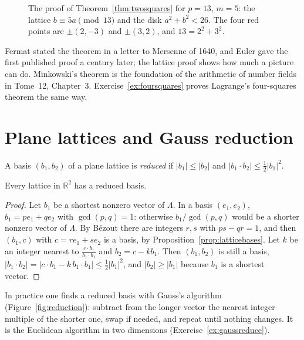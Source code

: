 \begin{figure}[ht]
\centering
{}
\caption{The proof of Theorem~\ref{thm:twosquares} for $p=13$, $m=5$: the lattice $b\equiv5a\pmod{13}$ and the disk $a^2+b^2<26$. The four red points are
$\pm(2,-3)$ and $\pm(3,2)$, and $13=2^2+3^2$.}
\label{fig:twosquares}
\end{figure}

Fermat stated the theorem in a letter to Mersenne of 1640, and Euler gave the first published proof a century later; the lattice proof shows how much a
picture can do. Minkowski's theorem is the foundation of the arithmetic of number fields in Tome~12, Chapter~3. Exercise~\ref{ex:foursquares} proves
Lagrange's four-squares theorem the same way.

\section{Plane lattices and Gauss reduction}

\begin{definition}
A basis $(b_1,b_2)$ of a plane lattice is \emph{reduced} if $|b_1|\le|b_2|$ and $|b_1\cdot b_2|\le\frac12|b_1|^2$.
\end{definition}

\begin{proposition}\label{prop:reducedexists}
Every lattice in $\mathbb R^2$ has a reduced basis.
\end{proposition}

\begin{proof}
Let $b_1$ be a shortest nonzero vector of $\Lambda$. In a basis $(e_1,e_2)$, $b_1=pe_1+qe_2$ with $\gcd(p,q)=1$: otherwise $b_1/\gcd(p,q)$ would be a
shorter nonzero vector of $\Lambda$. By B\'ezout there are integers $r,s$ with $ps-qr=1$, and then $(b_1,c)$ with $c=re_1+se_2$ is a basis, by
Proposition~\ref{prop:latticebases}. Let $k$ be an integer nearest to $\frac{c\cdot b_1}{b_1\cdot b_1}$ and $b_2=c-kb_1$. Then $(b_1,b_2)$ is still a basis,
$|b_1\cdot b_2|=|c\cdot b_1-k\,b_1\cdot b_1|\le\frac12|b_1|^2$, and $|b_2|\ge|b_1|$ because $b_1$ is a shortest vector.
\end{proof}

In practice one finds a reduced basis with Gauss's algorithm (Figure~\ref{fig:reduction}): subtract from the longer vector the nearest integer multiple of the
shorter one, swap if needed, and repeat until nothing changes. It is the Euclidean algorithm in two dimensions (Exercise~\ref{ex:gaussreduce}).

